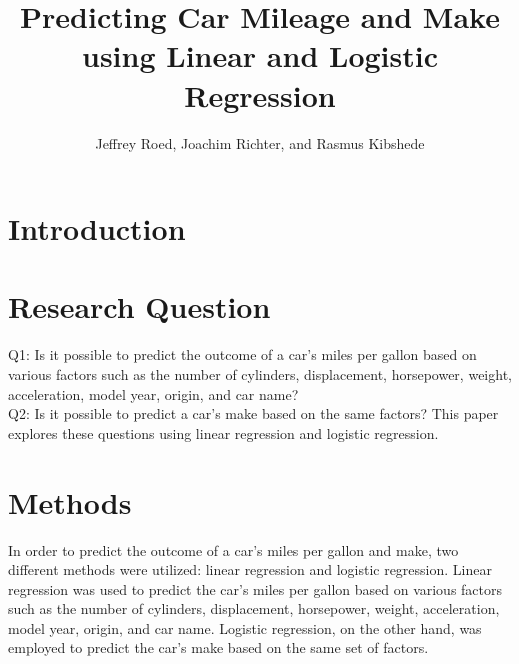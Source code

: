 \documentclass[a4paper, twocolumn]{article}
\author{Jeffrey Roed, Joachim Richter, and Rasmus Kibshede}
\title{Predicting Car Mileage and Make using Linear and Logistic Regression}
\begin{document}
\twocolumn[
    \begin{@twocolumnfalse}
        \maketitle
        \begin{abstract}
            
        \end{abstract}
    \end{@twocolumnfalse}
    \vspace{1cm}
]


\section{Introduction\label{sec:Introduction}}


\section{Research Question\label{sec:Research Question}}
Q1: Is it possible to predict the outcome of a car's miles per gallon based on various factors such as the number of cylinders, displacement, horsepower, weight, acceleration, model year, origin, and car name?\\
Q2: Is it possible to predict a car's make based on the same factors? This paper explores these questions using linear regression and logistic regression.


\section{Methods\label{sec:Methods}}

In order to predict the outcome of a car's miles per gallon and make, two different methods were utilized: linear regression and logistic regression. Linear regression was used to predict the car's miles per gallon based on various factors such as the number of cylinders, displacement, horsepower, weight, acceleration, model year, origin, and car name. Logistic regression, on the other hand, was employed to predict the car's make based on the same set of factors.
\end{document}
